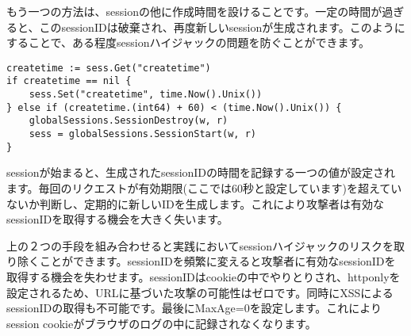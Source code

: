 もう一つの方法は、sessionの他に作成時間を設けることです。一定の時間が過ぎると、このsessionIDは破棄され、再度新しいsessionが生成されます。このようにすることで、ある程度sessionハイジャックの問題を防ぐことができます。

\begin{lstlisting}[numbers=none]
createtime := sess.Get("createtime")
if createtime == nil {
    sess.Set("createtime", time.Now().Unix())
} else if (createtime.(int64) + 60) < (time.Now().Unix()) {
    globalSessions.SessionDestroy(w, r)
    sess = globalSessions.SessionStart(w, r)
}
\end{lstlisting}

sessionが始まると、生成されたsessionIDの時間を記録する一つの値が設定されます。毎回のリクエストが有効期限(ここでは60秒と設定しています)を超えていないか判断し、定期的に新しいIDを生成します。これにより攻撃者は有効なsessionIDを取得する機会を大きく失います。

上の２つの手段を組み合わせると実践においてsessionハイジャックのリスクを取り除くことができます。sessionIDを頻繁に変えると攻撃者に有効なsessionIDを取得する機会を失わせます。sessionIDはcookieの中でやりとりされ、httponlyを設定されるため、URLに基づいた攻撃の可能性はゼロです。同時にXSSによるsessionIDの取得も不可能です。最後にMaxAge=0を設定します。これによりsession cookieがブラウザのログの中に記録されなくなります。

